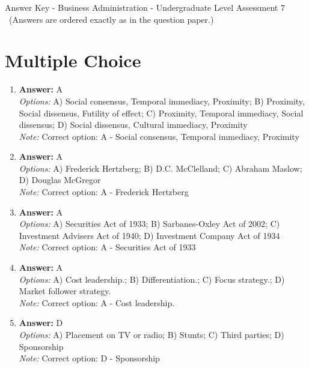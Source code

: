 \documentclass[12pt]{article}
\begin{document}
\begin{center}
Answer Key - Business Administration - Undergraduate Level Assessment 7 \
\small (Answers are ordered exactly as in the question paper.)
\end{center}

\section*{Multiple Choice}
\begin{enumerate}[label=\arabic*.]
\item \textbf{Answer:} A
\\ \textit{Options:} A) Social consensus, Temporal immediacy, Proximity; B) Proximity, Social dissensus, Futility of effect; C) Proximity, Temporal immediacy, Social dissensus; D) Social dissensus, Cultural immediacy, Proximity
\\ \textit{Note:} Correct option: A - Social consensus, Temporal immediacy, Proximity
\item \textbf{Answer:} A
\\ \textit{Options:} A) Frederick Hertzberg; B) D.C. McClelland; C) Abraham Maslow; D) Douglas McGregor
\\ \textit{Note:} Correct option: A - Frederick Hertzberg
\item \textbf{Answer:} A
\\ \textit{Options:} A) Securities Act of 1933; B) Sarbanes-Oxley Act of 2002; C) Investment Advisers Act of 1940; D) Investment Company Act of 1934
\\ \textit{Note:} Correct option: A - Securities Act of 1933
\item \textbf{Answer:} A
\\ \textit{Options:} A) Cost leadership.; B) Differentiation.; C) Focus strategy.; D) Market follower strategy.
\\ \textit{Note:} Correct option: A - Cost leadership.
\item \textbf{Answer:} D
\\ \textit{Options:} A) Placement on TV or radio; B) Stunts; C) Third parties; D) Sponsorship
\\ \textit{Note:} Correct option: D - Sponsorship
\end{enumerate}
\end{document}
